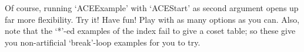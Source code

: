 Of course, running `ACEExample' with  `ACEStart'  as  second  argument
opens up far more flexibility. Try it! Have fun!  Play  with  as  many
options as you can. Also, note that the `*'-ed examples of  the  index
fail  to  give  a  coset  table;  so  these  give  you  non-artificial
`break'-loop examples for you to try.


